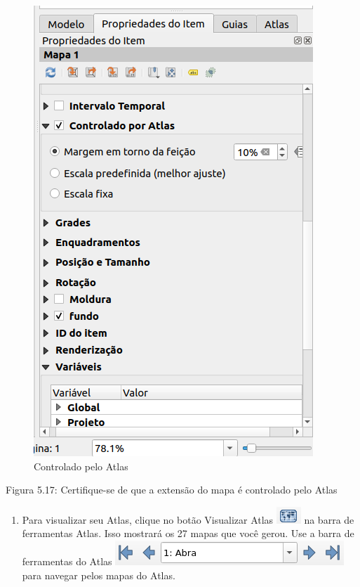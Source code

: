 \documentclass[
  portuguese,
]{krantz}
\providecommand{\tightlist}{%
  \setlength{\itemsep}{0pt}\setlength{\parskip}{0pt}}
\begin{document}
\begin{figure}
\centering
\includegraphics{media/modulo5/atlas-controlled.png}
\caption{Controlado pelo Atlas}
\end{figure}

Figura 5.17: Certifique-se de que a extensão do mapa é controlado pelo Atlas

\begin{enumerate}
\def\labelenumi{\arabic{enumi}.}
\setcounter{enumi}{4}
\tightlist
\item
  Para visualizar seu Atlas, clique no botão Visualizar Atlas \includegraphics{media/modulo5/atlas-preview-btn.png} na barra de ferramentas Atlas. Isso mostrará os 27 mapas que você gerou. Use a barra de ferramentas do Atlas \includegraphics{media/modulo5/atlas-toolbar-nav.png} para navegar pelos mapas do Atlas.
\end{enumerate}
\end{document}

